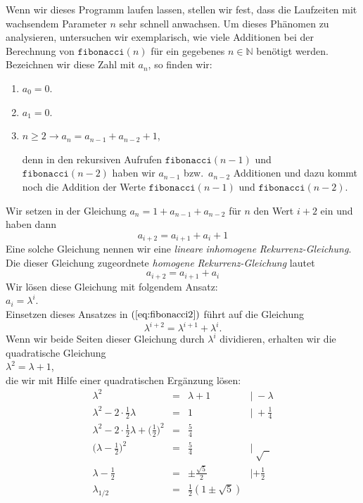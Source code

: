 Wenn wir dieses Programm laufen lassen, stellen wir fest, dass die Laufzeiten mit
wachsendem Parameter $n$ sehr schnell anwachsen.  Um dieses Ph\"{a}nomen zu analysieren,
untersuchen wir exemplarisch, wie viele Additionen bei der Berechnung von
$\texttt{fibonacci}(n)$ f\"{u}r ein gegebenes $n \in \mathbb{N}$ ben\"{o}tigt werden.  Bezeichnen wir
diese Zahl mit $a_n$, so finden wir:
\begin{enumerate}
\item $a_0 = 0$.
\item $a_1 = 0$.
\item $n \geq 2 \rightarrow a_n = a_{n-1} + a_{n-2} + 1$,

      denn in den rekursiven Aufrufen $\texttt{fibonacci}(n-1)$ und $\texttt{fibonacci}(n-2)$ haben wir 
      $a_{n-1}$ bzw.~$a_{n-2}$ Additionen und dazu kommt noch die Addition der Werte
      $\texttt{fibonacci}(n-1)$ und $\texttt{fibonacci}(n-2)$.
\end{enumerate}
Wir setzen in der  Gleichung $a_n = 1 + a_{n-1} + a_{n-2}$ f\"{u}r $n$ den Wert $i+2$ ein und
haben dann 
\begin{equation}
  \label{eq:fibonacci1}
 a_{i+2} = a_{i+1} + a_i + 1  
\end{equation}
Eine solche Gleichung nennen wir eine \emph{lineare} \emph{inhomogene}
\emph{Rekur\-renz-Gleichung}.   Die dieser Gleichung zugeordnete \emph{homogene}
\emph{Rekurrenz-Gleichung} lautet 
\begin{equation}
  \label{eq:fibonacci2}
 a_{i+2} = a_{i+1} + a_i   
\end{equation}
Wir l\"{o}sen diese Gleichung mit folgendem Ansatz: \\[0.2cm]
\hspace*{1.3cm} $a_i = \lambda^i$. \\[0.2cm]
Einsetzen dieses Ansatzes in $(\ref{eq:fibonacci2})$ f\"{u}hrt auf die Gleichung 
\[ \lambda^{i+2} = \lambda^{i+1} + \lambda^i. \]
Wenn wir beide Seiten  dieser Gleichung durch $\lambda^i$ dividieren, erhalten wir die
quadratische Gleichung \\[0.2cm]
\hspace*{1.3cm} $\lambda^2 = \lambda + 1$, \\[0.2cm]
die wir mit Hilfe einer quadratischen Erg\"{a}nzung l\"{o}sen: \\[0.2cm]
\[\begin{array}{lcll}
  \lambda^2     & = & \lambda + 1                               & |\;- \lambda \\[0.2cm]
  \lambda^2 - 2 \cdot \frac{1}{2} \lambda & = & 1                   & |\;+ \frac{1}{4} \\[0.2cm]
  \lambda^2 - 2 \cdot \frac{1}{2} \lambda + \Big(\frac{1}{2}\Big)^2 & = &  \frac{5}{4} &  \\[0.2cm]
  \Big(\lambda -\frac{1}{2}\Big)^2 & = & \frac{5}{4}         & |\;\sqrt{\;\;} \\[0.2cm]
  \lambda -\frac{1}{2} & = & \pm\frac{\sqrt{5}}{2}           & | + \frac{1}{2} \\[0.2cm]
  \lambda_{1/2}  & = & \frac{1}{2} (1 \pm \sqrt{5}) & \\
 \end{array}
\]
